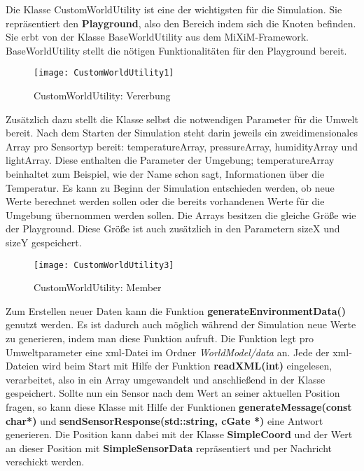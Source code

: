 Die Klasse CustomWorldUtility ist eine der wichtigsten für die Simulation. Sie repräsentiert den \textbf{Playground}, also den Bereich indem sich die Knoten befinden. Sie erbt von der Klasse BaseWorldUtility aus dem MiXiM-Framework. BaseWorldUtility stellt die nötigen Funktionalitäten für den Playground bereit. \newline

\begin{figure}[htbp]
\centering
\caption{CustomWorldUtility: Vererbung}
\texttt{[image: CustomWorldUtility1]}
\end{figure}

Zusätzlich dazu stellt die Klasse selbst die notwendigen Parameter für die Umwelt bereit. Nach dem Starten der Simulation steht darin jeweils ein zweidimensionales Array pro Sensortyp bereit: temperatureArray, pressureArray, humidityArray und lightArray. Diese enthalten die Parameter der Umgebung; temperatureArray beinhaltet zum Beispiel, wie der Name schon sagt, Informationen über die Temperatur. \newline
Es kann zu Beginn der Simulation entschieden werden, ob neue Werte berechnet werden sollen oder die bereits vorhandenen Werte für die Umgebung übernommen werden sollen. Die Arrays besitzen die gleiche Größe wie der Playground. Diese Größe ist auch zusätzlich in den Parametern sizeX und sizeY gespeichert.


\begin{figure}[htbp]
\centering
\caption{CustomWorldUtility: Member}
\texttt{[image: CustomWorldUtility3]}
\end{figure}

Zum Erstellen neuer Daten kann die Funktion \textbf{generateEnvironmentData()} genutzt werden. Es ist dadurch auch möglich während der Simulation neue Werte zu generieren, indem man diese Funktion aufruft. Die Funktion legt pro Umweltparameter eine xml-Datei im Ordner \textit{WorldModel/data} an. Jede der xml-Dateien wird beim Start mit Hilfe der Funktion \textbf{readXML(int)} eingelesen, verarbeitet, also in ein Array umgewandelt und anschließend in der Klasse gespeichert. \newline
Sollte nun ein Sensor nach dem Wert an seiner aktuellen Position fragen, so kann diese Klasse mit Hilfe der Funktionen \textbf{generateMessage(const char*)} und \textbf{sendSensorResponse(std::string, cGate *)} eine Antwort generieren. Die Position kann dabei mit der Klasse \textbf{SimpleCoord} und der Wert an dieser Position mit \textbf{SimpleSensorData} repräsentiert und per Nachricht verschickt werden.

